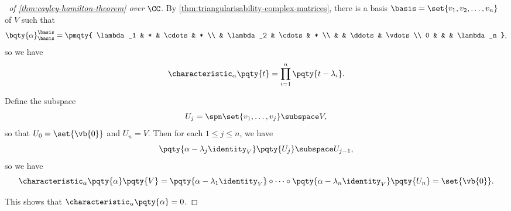 \begin{proof}[\proofname\ of \autoref{thm:cayley-hamilton-theorem} over \(\CC\)]
    By \autoref{thm:triangularisability-complex-matrices}, there is a basis
    \(\basis = \set{v_1, v_2, \ldots, v_n}\) of \(V\) such that
    \[
        \bqty{\alpha}_{\basis}^{\basis} = \pmqty{
            \lambda_1 & * & \cdots & * \\
             & \lambda_2 & \cdots & * \\
             & & \ddots & \vdots \\
            0 & & & \lambda_n
        },
    \]
    so we have
    \[
        \characteristic_{\alpha}\pqty{t} = \prod_{i = 1}^{n} \pqty{t - \lambda_i}.
    \]

    Define the subspace
    \[
        U_j = \spn\set{v_1, \ldots, v_j} \subspace V,
    \]
    so that \(U_0 = \set{\vb{0}}\) and \(U_n = V\). Then for each \(1 \leq j \leq n\), we have
    \[
        \pqty{\alpha - \lambda_j \identity_V}\pqty{U_j} \subspace U_{j - 1},
    \]
    so we have
    \[
        \characteristic_{\alpha} \pqty{\alpha} \pqty{V} = \pqty{\alpha - \lambda_1 \identity_V} \circ \cdots \circ \pqty{\alpha - \lambda_n \identity_V} \pqty{U_n} = \set{\vb{0}}.
    \]

    This shows that \(\characteristic_{\alpha}\pqty{\alpha} = 0\).
\end{proof}

